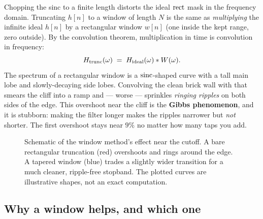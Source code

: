 Chopping the sinc to a finite length distorts the ideal $\operatorname{rect}$ mask in the
frequency domain. Truncating $h[n]$ to a window of
length $N$ is the same as \emph{multiplying} the infinite ideal $h[n]$ by a
rectangular window $w[n]$ (one inside the kept range, zero outside). By the
convolution theorem, multiplication in time is convolution in frequency:
\[
H_{\text{trunc}}(\omega) \;=\; H_{\text{ideal}}(\omega) \ast W(\omega).
\]
The spectrum of a rectangular window is a $\operatorname{sinc}$-shaped curve with a tall main
lobe and slowly-decaying side lobes. Convolving the clean brick wall with that
smears the cliff into a ramp and --- worse --- sprinkles \emph{ringing ripples} on
both sides of the edge. This overshoot near the cliff is the \textbf{Gibbs
phenomenon}, and it is stubborn: making the filter longer makes the ripples
narrower but \emph{not} shorter. The first overshoot stays near $9\%$ no matter
how many taps you add.

\begin{figure}[H]
\centering
{}
\caption{Schematic of the window method's effect near the cutoff. A bare
rectangular truncation (red) overshoots and rings around the edge. A tapered
window (blue) trades a slightly wider transition for a much cleaner, ripple-free
stopband. The plotted curves are illustrative shapes, not an exact computation.}
\label{ch16:fig-gibbs}
\end{figure}

\subsection{Why a window helps, and which one}
\label{ch16:windows}

